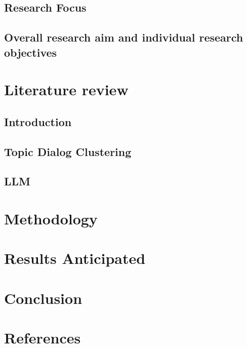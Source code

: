 \documentclass{article}
\begin{document}
\subsection{Research Focus}
\subsection{Overall research aim and individual research objectives}

\newpage
\section{Literature review}
\subsection{Introduction}
\subsection{Topic Dialog Clustering}
\subsection{LLM}

\newpage
\section{Methodology}

\newpage
\section{Results Anticipated}

\newpage
\section{Conclusion}

\newpage
\section{References}
\end{document}
